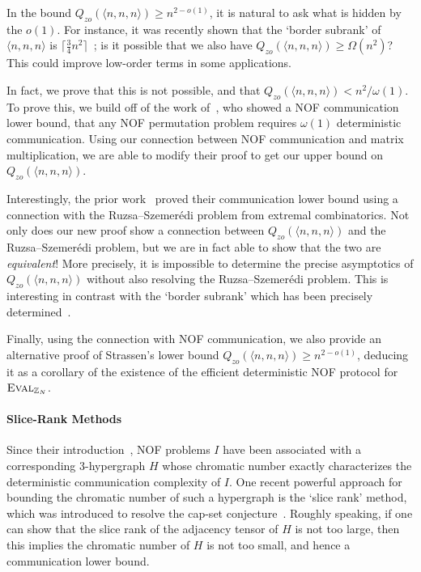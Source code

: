 \documentclass[10pt,a4paper]{article}
\newcommand{\bZ}{\mathbb{Z}}
\newcommand{\eval}{\textsc{Eval}}
\begin{document}
    In the bound $Q_{zo}(\langle n,n,n \rangle) \geq n^{2 - o(1)}$, it is natural to ask what is hidden by the $o(1)$. For instance, it was recently shown that the `border subrank' of $\langle n,n,n \rangle$ is $\lceil \frac34 n^2 \rceil$~\cite{KMZ20}; is it possible that we also have $Q_{zo}(\langle n,n,n \rangle) \geq \Omega(n^2)$? This could improve low-order terms in some applications.
    
    In fact, we prove that this is not possible, and that $Q_{zo}(\langle n,n,n \rangle) < n^2 / \omega(1)$. To prove this, we build off of the work of~\cite{LPS17}, who showed a NOF communication lower bound, that any NOF permutation problem requires $\omega(1)$ deterministic communication. Using our connection between NOF communication and matrix multiplication, we are able to modify their proof to get our upper bound on $Q_{zo}(\langle n,n,n \rangle)$.
    
    Interestingly, the prior work~\cite{LPS17} proved their communication lower bound using a connection with the Ruzsa–Szemerédi problem from extremal combinatorics. Not only does our new proof show a connection between $Q_{zo}(\langle n,n,n \rangle)$ and the Ruzsa–Szemerédi problem, but we are in fact able to show that the two are \emph{equivalent}! More precisely, it is impossible to determine the precise asymptotics of $Q_{zo}(\langle n,n,n \rangle)$ without also resolving the Ruzsa–Szemerédi problem. This is interesting in contrast with the `border subrank' which has been precisely determined~\cite{KMZ20}.
    
     Finally, using the connection with NOF communication, we also provide an alternative proof of Strassen's lower bound $Q_{zo}(\langle n,n,n \rangle) \geq n^{2 - o(1)}$, deducing it as a corollary of the existence of the efficient deterministic NOF protocol for $\eval_{\bZ_N}$.

     \paragraph{Slice-Rank Methods}

     Since their introduction~\cite{CFL83}, NOF problems $I$ have been associated with a corresponding 3-hypergraph $H$ whose chromatic number exactly characterizes the deterministic communication complexity of $I$. One recent powerful approach for bounding the chromatic number of such a hypergraph is the `slice rank' method, which was introduced to resolve the cap-set conjecture~\cite{CLP17,ED17}. Roughly speaking, if one can show that the slice rank of the adjacency tensor of $H$ is not too large, then this implies the chromatic number of $H$ is not too small, and hence a communication lower bound.
     
\end{document}
